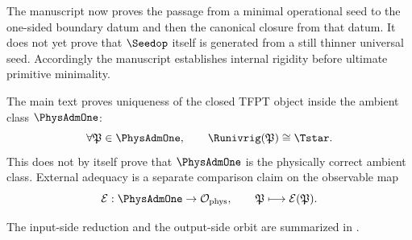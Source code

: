 \begin{remark}
The manuscript now proves the passage from a minimal operational seed to the one-sided boundary
datum and then the canonical closure from that datum. It does not yet prove that $\Seedop$ itself is
generated from a still thinner universal seed. Accordingly the manuscript establishes internal
rigidity before ultimate primitive minimality.
\end{remark}

\begin{remark}
The main text proves uniqueness of the closed TFPT object inside the ambient class $\PhysAdmOne$:
\[
\forall \mathfrak P\in\PhysAdmOne,\qquad
\Runivrig(\mathfrak P)\cong \Tstar.
\]
This does not by itself prove that $\PhysAdmOne$ is the physically correct ambient class. External
adequacy is a separate comparison claim on the observable map
\[
\mathcal E:\PhysAdmOne\to\mathcal O_{\mathrm{phys}},
\qquad
\mathfrak P\longmapsto \mathcal E(\mathfrak P).
\]
\end{remark}

The input-side reduction and the output-side orbit are summarized in
.

